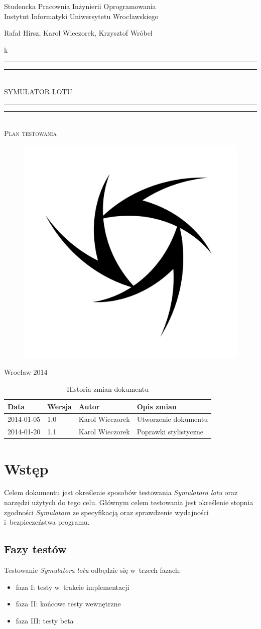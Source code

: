 \documentclass{mwrep}
\newcommand*{\titleGP}{\begingroup
\centering

{\large Studencka Pracownia Inżynierii Oprogramowania}\\Instytut Informatyki Uniwersytetu Wrocławskiego\par
\vspace*{16\baselineskip}

{\Large Rafał Hirsz, Karol Wieczorek, Krzysztof Wróbel\par}
\vspace*{\baselineskip}k

\rule{\textwidth}{1.6pt}\vspace*{-\baselineskip}\vspace*{2pt}
\rule{\textwidth}{0.4pt}\\[\baselineskip]

{\Huge SYMULATOR LOTU}\\[0.2\baselineskip]

\rule{\textwidth}{0.4pt}\vspace*{-\baselineskip}\vspace{3.2pt}
\rule{\textwidth}{1.6pt}\\[\baselineskip]

\scshape
{\huge Plan testowania}\par
\vspace*{2\baselineskip}

\begin{figure}[h]
\centering
\includegraphics[width=5\baselineskip]{flightsim-team-logo.pdf}
\end{figure}
\vfill

{\large Wrocław 2014}\par

\pagebreak

\endgroup}
\begin{document}
\thispagestyle{empty}
\titleGP

\begin{center}
\begin{table}[h]
\begin{center}
\caption{Historia zmian dokumentu}\label{T:Zmiany}
\vspace{3ex}
\begin{tabularx}{1\textwidth}{|l|l|l|X|}
\hline
Data & Wersja & Autor & Opis zmian \\ \hline
2014-01-05 & 1.0 & Karol Wieczorek & Utworzenie dokumentu \\
2014-01-20 & 1.1 & Karol Wieczorek & Poprawki stylistyczne \\
\hline
\end{tabularx}
\end{center}
\end{table}
\end{center}

\pagebreak

\tableofcontents

\chapter{Wstęp}
Celem dokumentu jest określenie sposobów testowania \textit{Symulatora lotu} oraz narzędzi użytych do tego celu. Głównym celem testowania jest określenie stopnia zgodności \textit{Symulatora} ze specyfikacją oraz sprawdzenie wydajności i~bezpieczeństwa programu.

\section{Fazy testów}
Testowanie \textit{Symulatora lotu} odbędzie się w~trzech fazach:
\begin{itemize}
  \item faza I: testy w~trakcie implementacji
  \item faza II: końcowe testy wewnętrzne
  \item faza III: testy beta
\end{itemize}
\end{document}

